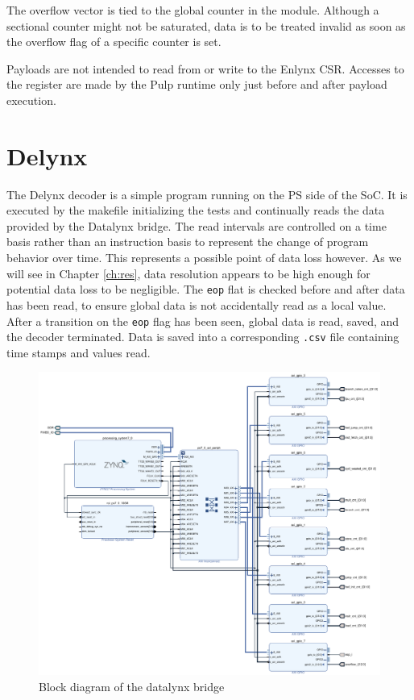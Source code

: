 \documentclass[../bachelor_paper.tex]{subfiles}
\begin{document}
The overflow vector is tied to the global counter in the module. Although a sectional counter might not be saturated, data is to be treated invalid as soon as the overflow flag of a specific counter is set.

Payloads are not intended to read from or write to the Enlynx \ac{CSR}. Accesses to the register are made by the Pulp runtime only just before and after payload execution.

\section{Delynx}
The Delynx decoder is a simple program running on the \ac{PS} side of the \ac{SoC}. It is executed by the makefile initializing the tests and continually reads the data provided by the Datalynx bridge. The read intervals are controlled on a time basis rather than an instruction basis to represent the change of program behavior over time. This represents a possible point of data loss however. As we will see in Chapter \ref{ch:res}, data resolution appears to be high enough for potential data loss to be negligible. The \texttt{eop} flat is checked before and after data has been read, to ensure global data is not accidentally read as a local value. After a transition on the \texttt{eop} flag has been seen, global data is read, saved, and the decoder terminated. Data is saved into a corresponding \texttt{.csv} file containing time stamps and values read.

\begin{figure}
    \centering
    \includegraphics[width=\textwidth]{img/datalynx_bd.pdf}
    \caption{Block diagram of the datalynx bridge}
    \label{fig:arch/comm/block}
\end{figure}

\isstandalone



\fi
\end{document}
